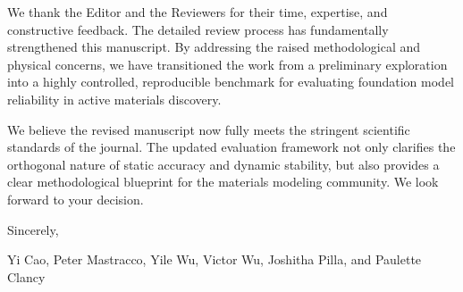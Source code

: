 \documentclass[11pt]{article}
\begin{document}
We thank the Editor and the Reviewers for their time, expertise, and constructive feedback. The detailed review process has fundamentally strengthened this manuscript. By addressing the raised methodological and physical concerns, we have transitioned the work from a preliminary exploration into a highly controlled, reproducible benchmark for evaluating foundation model reliability in active materials discovery.

We believe the revised manuscript now fully meets the stringent scientific standards of the journal. The updated evaluation framework not only clarifies the orthogonal nature of static accuracy and dynamic stability, but also provides a clear methodological blueprint for the materials modeling community. We look forward to your decision.

\vspace{2em}
Sincerely,

\vspace{1em}
\noindent
Yi Cao, Peter Mastracco, Yile Wu, Victor Wu, Joshitha Pilla, and Paulette Clancy

\vspace{2em}

{\small\setlength{\bibsep}{2pt}
}
\end{document}
